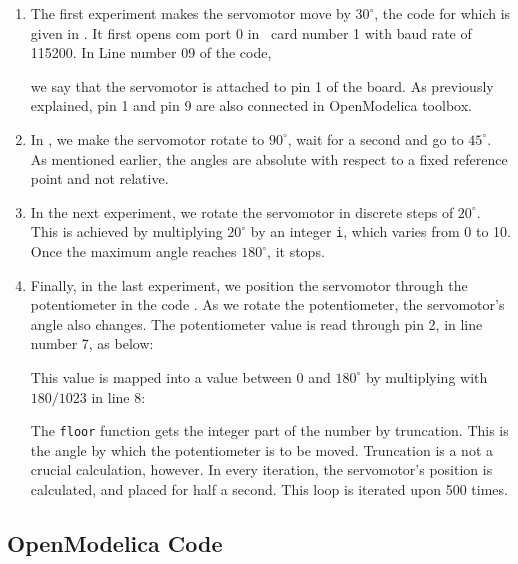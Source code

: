 \begin{enumerate}
\item The first experiment makes the servomotor move by $30^\circ$,
  the code for which is given in .
  It first opens com port 0 in \arduino\ card number 1 with baud rate
  of 115200.  In Line number 09 of the code, \ie\
  
  we say that the servomotor is attached to pin 1 of the board.
  As previously explained, pin 1 and pin 9 are also connected in OpenModelica
  toolbox.

\item In , we make the servomotor rotate
  to $90^\circ$, wait for a second and go to $45^\circ$.  As mentioned
  earlier, the angles are absolute with respect to a fixed reference
  point and not relative.  

\item In the next experiment, we rotate the servomotor in discrete
  steps of $20^\circ$.  This is achieved by multiplying $20^\circ$ by
  an integer {\tt i}, which varies from 0 to 10.  Once the maximum
  angle reaches $180^\circ$, it stops.  

\item Finally, in the last experiment, we position the servomotor
  through the potentiometer in the code .  As we
  rotate the potentiometer, the servomotor's angle also changes.  The
  potentiometer value is read through pin 2, in line number 7, as
  below:
  
  This value is mapped into a value between 0 and $180^\circ$ by
  multiplying with $180/1023$ in line 8:
  
  The {\tt floor} function gets the integer part of the number by
  truncation.  This is the angle by which the potentiometer is to be
  moved.  Truncation is a not a crucial calculation, however.  In
  every iteration, the servomotor's position is calculated, and placed
  for half a second.  This loop is iterated upon 500 times.

  \end{enumerate}

\subsection{OpenModelica Code}
\lstset{style=mystyle}
\label{sec:servo-OpenModelica-code}

